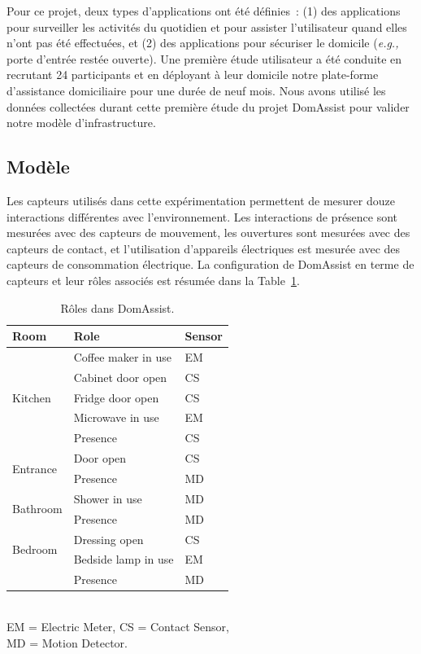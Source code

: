 Pour ce projet, deux types d'applications ont été définies~: (1) des applications 
pour surveiller les activités du quotidien et pour assister l'utilisateur quand elles 
n'ont pas été effectuées, et (2) des applications pour sécuriser le 
domicile ({\em e.g.,} porte d'entrée restée ouverte). Une première étude utilisateur a 
été conduite en recrutant 24 participants et en déployant à leur domicile notre 
plate-forme d'assistance domiciliaire pour une durée de neuf mois. Nous avons 
utilisé les données collectées durant cette première étude du projet DomAssist pour valider notre 
modèle d'infrastructure.

\subsection{Modèle}\label{validation:model} 
Les capteurs utilisés dans cette expérimentation permettent de mesurer douze 
interactions différentes avec l'environnement. Les interactions de présence sont 
mesurées avec des capteurs de mouvement, les ouvertures sont mesurées avec des 
capteurs de contact, et l'utilisation d'appareils électriques est mesurée avec 
des capteurs de consommation électrique. La configuration de DomAssist en terme 
de capteurs et leur rôles associés est résumée dans la Table~\ref{tab:domassist:role}.
\begin{table}[h!]
  \centering
  \begin{tabular}{|l|l|l|}
    \hline
    Room & Role & Sensor \\
    \hline
    \multirow{5}{*}{Kitchen} & Coffee maker in use & EM \\
    & Cabinet door open & CS \\
    & Fridge door open & CS \\
    & Microwave in use & EM \\
    & Presence & CS \\
    \hline
    \multirow{2}{*}{Entrance} & Door open & CS \\
    & Presence & MD \\
    \hline
    \multirow{2}{*}{Bathroom} & Shower in use & MD \\
    & Presence & MD \\
    \hline
    \multirow{2}{*}{Bedroom} & Dressing open & CS \\
    & Bedside lamp in use & EM \\
    & Presence & MD\\
    \hline
  \end{tabular}
\ \\ EM = Electric Meter, CS = Contact Sensor,\\ MD = Motion Detector.
  \caption{Rôles dans DomAssist.}
  \label{tab:domassist:role}
\end{table}

